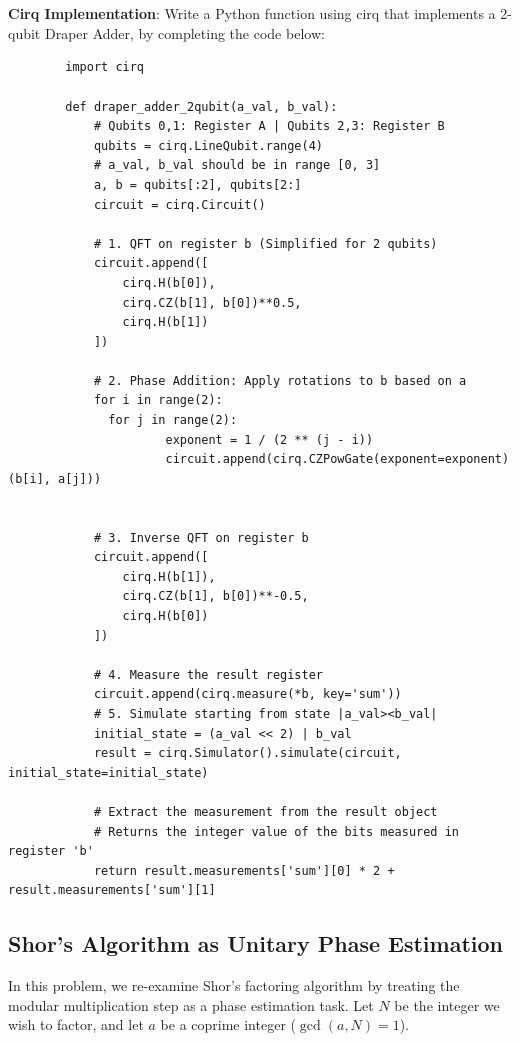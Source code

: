     \newline \\\\
\textbf{Cirq Implementation}: Write a Python function using cirq that implements a 2-qubit Draper Adder, by completing the code below: \\
    \begin{lstlisting}
        import cirq

        def draper_adder_2qubit(a_val, b_val):
            # Qubits 0,1: Register A | Qubits 2,3: Register B
            qubits = cirq.LineQubit.range(4)    
            # a_val, b_val should be in range [0, 3]
            a, b = qubits[:2], qubits[2:]       
            circuit = cirq.Circuit()
        
            # 1. QFT on register b (Simplified for 2 qubits)
            circuit.append([
                cirq.H(b[0]), 
                cirq.CZ(b[1], b[0])**0.5, 
                cirq.H(b[1])
            ])
        
            # 2. Phase Addition: Apply rotations to b based on a
            for i in range(2):
              for j in range(2):
                      exponent = 1 / (2 ** (j - i))
                      circuit.append(cirq.CZPowGate(exponent=exponent)(b[i], a[j]))
        
        
            # 3. Inverse QFT on register b
            circuit.append([
                cirq.H(b[1]), 
                cirq.CZ(b[1], b[0])**-0.5, 
                cirq.H(b[0])
            ])

            # 4. Measure the result register
            circuit.append(cirq.measure(*b, key='sum'))  
            # 5. Simulate starting from state |a_val><b_val|
            initial_state = (a_val << 2) | b_val         
            result = cirq.Simulator().simulate(circuit, initial_state=initial_state)
            
            # Extract the measurement from the result object
            # Returns the integer value of the bits measured in register 'b'
            return result.measurements['sum'][0] * 2 + result.measurements['sum'][1]

    \end{lstlisting}











\newpage
\subsection{Shor's Algorithm as Unitary Phase Estimation}
In this problem, we re-examine Shor’s factoring algorithm by treating the modular multiplication step as a phase estimation task. Let $N$ be the integer we wish to factor, and let $a$ be a coprime integer ($\gcd(a,N) = 1$). \\

